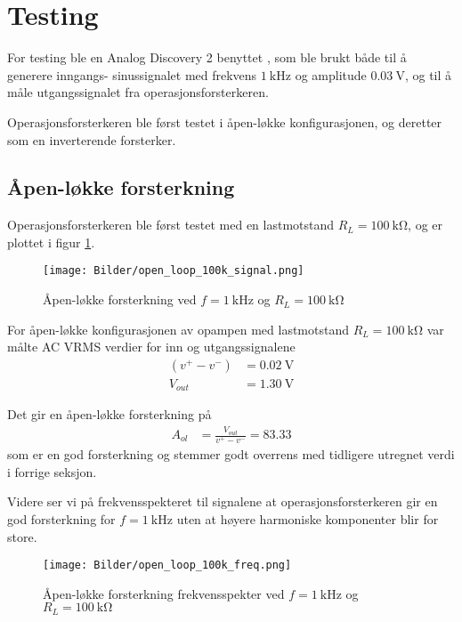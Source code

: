 \section{Testing}

For testing ble en Analog Discovery 2 benyttet \cite{analog_discovery}, som ble brukt både til å
generere inngangs- sinussignalet med frekvens $\SI{1}{\kilo\hertz}$ og amplitude $\SI{0.03}{\volt}$, og 
til å måle utgangssignalet fra operasjonsforsterkeren.

Operasjonsforsterkeren ble først testet i åpen-løkke konfigurasjonen, og deretter som en inverterende forsterker.

\subsection{Åpen-løkke forsterkning}
Operasjonsforsterkeren ble først testet med en lastmotstand $R_L = \SI{100}{\kilo\ohm}$, og 
er plottet i figur \ref{fig:open_loop_100k_signal}.

\begin{figure}[H]
    \centering
    \texttt{[image: Bilder/open\_loop\_100k\_signal.png]}
    \caption{Åpen-løkke forsterkning ved $f=\SI{1}{\kilo\hertz}$ og $R_L = \SI{100}{\kilo\ohm}$}
    \label{fig:open_loop_100k_signal}
\end{figure}

For åpen-løkke konfigurasjonen av opampen med lastmotstand $R_L = \SI{100}{\kilo\ohm}$
var målte AC VRMS verdier for inn og utgangssignalene 
\begin{align*}
    (v^+ - v^-) &= \SI{0.02}{\volt} \\
    V_{out} &= \SI{1.30}{\volt}
\end{align*}

Det gir en åpen-løkke forsterkning på
\begin{align*}
    A_{ol} &= \frac{V_{out}}{v^+ - v^-} = 83.33
\end{align*}
som er en god forsterkning og stemmer godt overrens med tidligere utregnet verdi i forrige seksjon.

Videre ser vi på frekvensspekteret til signalene at operasjonsforsterkeren gir en god forsterkning 
for $f = \SI{1}{\kilo\hertz}$ uten at høyere harmoniske komponenter blir for store.

\begin{figure}[H]
    \centering
    \texttt{[image: Bilder/open\_loop\_100k\_freq.png]}
    \caption{Åpen-løkke forsterkning frekvensspekter ved $f=\SI{1}{\kilo\hertz}$ og $R_L = \SI{100}{\kilo\ohm}$}
    \label{fig:open_loop_100k_freq}
\end{figure}

